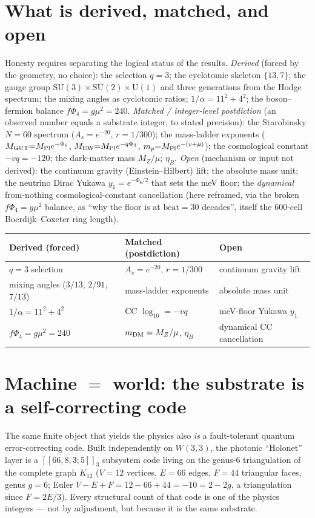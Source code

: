 \documentclass[11pt]{article}
\newcommand{\Pl}{M_{\rm Pl}}
\begin{document}




\section{What is derived, matched, and open}
Honesty requires separating the logical status of the results. \emph{Derived} (forced by the
geometry, no choice): the selection $q=3$; the cyclotomic skeleton $\{13,7\}$; the gauge group
$\mathrm{SU}(3){\times}\mathrm{SU}(2){\times}\mathrm{U}(1)$ and three generations from the
Hodge spectrum; the mixing angles as cyclotomic ratios; $1/\alpha=11^2+4^2$; the boson--fermion
balance $f\Phi_4=g\mu^2=240$. \emph{Matched / integer-level postdiction} (an observed number
equals a substrate integer, to stated precision): the Starobinsky $N=60$ spectrum
($A_s=e^{-20}$, $r=1/300$); the mass-ladder exponents ($M_{\rm GUT}{=}\Pl e^{-\Phi_6}$, $M_{\rm
EW}{=}\Pl e^{-q\Phi_3}$, $m_p{=}\Pl e^{-(v+\mu)}$); the cosmological constant $-vq=-120$; the
dark-matter mass $M_Z/\mu$; $\eta_B$. \emph{Open} (mechanism or input not derived): the continuum
gravity (Einstein--Hilbert) lift; the absolute mass unit; the neutrino Dirac Yukawa $y_1=
e^{-\Phi_6/2}$ that sets the meV floor; the \emph{dynamical} from-nothing cosmological-constant
cancellation (here reframed, via the broken $f\Phi_4=g\mu^2$ balance, as ``why the floor is at
$\mathrm{beat}=30$ decades'', itself the $600$-cell Boerdijk--Coxeter ring length).

\begin{center}\small
\begin{tabular}{lll}
\toprule
Derived (forced) & Matched (postdiction) & Open\\ \midrule
$q=3$ selection & $A_s=e^{-20}$, $r=1/300$ & continuum gravity lift\\
mixing angles ($3/13$, $2/91$, $7/13$) & mass-ladder exponents & absolute mass unit\\
$1/\alpha=11^2+4^2$ & CC $\log_{10}=-vq$ & meV-floor Yukawa $y_1$\\
$f\Phi_4=g\mu^2=240$ & $m_{\rm DM}=M_Z/\mu$, $\eta_B$ & dynamical CC cancellation\\
\bottomrule
\end{tabular}
\end{center}

\section{Machine $=$ world: the substrate is a self-correcting code}
The same finite object that yields the physics also \emph{is} a fault-tolerant quantum
error-correcting code. Built independently on $W(3,3)$, the photonic ``Holonet'' layer is a
$[\![ 66,8,3;5]\!]_3$ subsystem code living on the genus-$6$ triangulation of the
complete graph $K_{12}$ ($V=12$ vertices, $E=66$ edges, $F=44$ triangular faces, genus $g=6$;
Euler $V-E+F=12-66+44=-10=2-2g$, a triangulation since $F=2E/3$). Every structural count of that
code is one of the physics integers --- not by adjustment, but because it is the same substrate.
\end{document}
